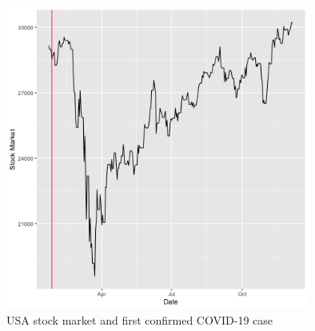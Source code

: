 \documentclass[11pt]{article}
\begin{document}
\begin{figure}[!h]
\centering
  \includegraphics[width=100mm]{R-Code/plots/usaFinance.png} 
    \caption{USA stock market and first confirmed COVID-19 case}
\end{figure}

\clearpage
\medskip
\newpage
 
\end{document}
